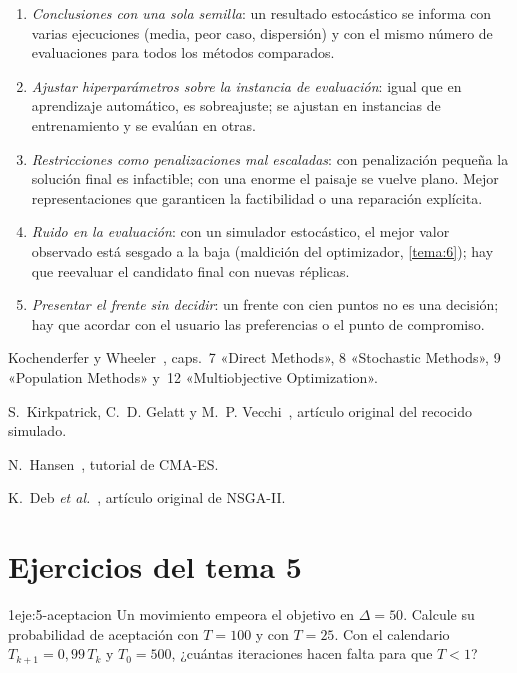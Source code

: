 \begin{observacion}\label{obs:errores5}
\begin{enumerate}[label=(\alph*)]
  \item \emph{Conclusiones con una sola semilla}: un resultado estocástico se informa con varias ejecuciones (media, peor caso, dispersión) y con el mismo número de evaluaciones para todos los métodos comparados.
  \item \emph{Ajustar hiperparámetros sobre la instancia de evaluación}: igual que en aprendizaje automático, es sobreajuste; se ajustan en instancias de entrenamiento y se evalúan en otras.
  \item \emph{Restricciones como penalizaciones mal escaladas}: con penalización pequeña la solución final es infactible; con una enorme el paisaje se vuelve plano. Mejor representaciones que garanticen la factibilidad o una reparación explícita.
  \item \emph{Ruido en la evaluación}: con un simulador estocástico, el mejor valor observado está sesgado a la baja (maldición del optimizador, \cref{tema:6}); hay que reevaluar el candidato final con nuevas réplicas.
  \item \emph{Presentar el frente sin decidir}: un frente con cien puntos no es una decisión; hay que acordar con el usuario las preferencias o el punto de compromiso.
\end{enumerate}
\end{observacion}

\begin{lecturas}
\item Kochenderfer y Wheeler~\cite{kw}, caps.~7 «Direct Methods», 8 «Stochastic Methods», 9 «Population Methods» y~12 «Multiobjective Optimization».
\item S.~Kirkpatrick, C.~D. Gelatt y M.~P. Vecchi~\cite{kirkpatrick}, artículo original del recocido simulado.
\item N.~Hansen~\cite{hansen}, tutorial de CMA-ES.
\item K.~Deb \emph{et al.}~\cite{nsga2}, artículo original de NSGA-II.
\end{lecturas}

\section*{Ejercicios del tema 5}

\begin{ejercicio}{1}{eje:5-aceptacion}
Un movimiento empeora el objetivo en $\Delta=50$. Calcule su probabilidad de aceptación con $T=100$ y con $T=25$. Con el calendario $T_{k+1}=0{,}99\,T_k$ y $T_0=500$, ¿cuántas iteraciones hacen falta para que $T<1$?
\end{ejercicio}

